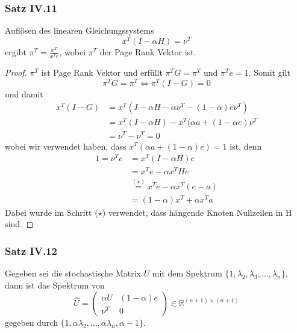 \documentclass[]{article}
\begin{document}
\subsubsection*{Satz IV.11}
Auflösen des linearen Gleichungssystems
\begin{equation}
	x^T (I- \alpha H) = \nu^T  \label{google_gleichungssystem}
\end{equation}
ergibt $\pi^T = \frac{x^T}{x^T e}$, wobei $\pi^T$ der Page Rank Vektor ist.
\begin{proof}
	$\pi^T$ ist Page Rank Vektor und erfüllt $\pi^T G = \pi^T$ und $\pi^T e = 1$. Somit gilt
	\[ \pi^T G = \pi^T \Leftrightarrow \pi^T ( I - G) = 0 \]
	und damit
	\begin{align*}
		x^T (I - G) &= x^T (I - \alpha H - \alpha \nu^T - (1-\alpha) e \nu^T) \\
		&= x^T (I- \alpha H) - x^T(\alpha a + (1 - \alpha e)\nu^T \\
		&= \nu^T - \nu^T = 0
	\end{align*}
	wobei wir verwendet haben, dass $ x^T (\alpha a + (1-\alpha) e)  = 1$
	ist, denn
	\begin{align*}
		1 = \nu^T e  &=x^T( I - \alpha H) e \\
		&= x^T e - \alpha x^T H e \\
		&\stackrel{(\star)}{=} x^T e - \alpha x^T (e-a) \\
		&= (1- \alpha) x^T + \alpha x^T a
	\end{align*}
	Dabei wurde im Schritt ($\star$) verwendet, dass hängende Knoten Nullzeilen in H sind.
\end{proof}


\subsubsection*{Satz IV.12}
Gegeben sei die stochastische Matrix $U$ mit dem Spektrum $\{1, \lambda_2, \lambda_3, \dotsc, \lambda_n \}$, dann ist das  Spektrum von 
\begin{equation*}
	\hat{U} = 
	\begin{pmatrix}
	\alpha U & (1-\alpha) e \\
	\nu^T & 0
	\end{pmatrix}
	\in \mathbb{R}^{(n+1) \times (n+1)}
\end{equation*}
gegeben durch $\{1, \alpha \lambda_2, \dotsc, \alpha\lambda_n, \alpha -1 \}$.
\end{document}
